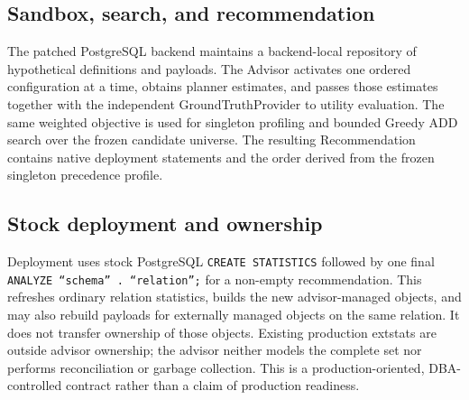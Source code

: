 \subsection{Sandbox, search, and recommendation}

The patched PostgreSQL backend maintains a backend-local repository of
hypothetical definitions and payloads. The Advisor activates one ordered
configuration at a time, obtains planner estimates, and passes those estimates
together with the independent GroundTruthProvider to utility evaluation. The
same weighted objective is used for singleton profiling and bounded Greedy ADD
search over the frozen candidate universe. The resulting Recommendation
contains native deployment statements and the order derived from the frozen
singleton precedence profile.

\subsection{Stock deployment and ownership}

Deployment uses stock PostgreSQL \texttt{CREATE STATISTICS} followed by one
final \texttt{ANALYZE ``schema'' . ``relation'';} for a non-empty
recommendation. This refreshes ordinary relation statistics, builds the new
advisor-managed objects, and may also rebuild payloads for externally managed
objects on the same relation. It does not transfer ownership of those
objects. Existing production extstats are outside advisor ownership; the
advisor neither models the complete set nor performs reconciliation or garbage
collection. This is a production-oriented, DBA-controlled contract rather than
a claim of production readiness.
